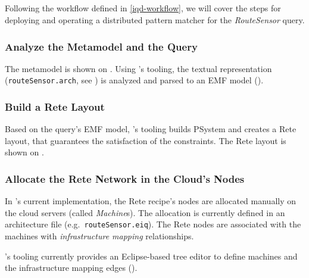 \subsection{}
\label{}

Following the workflow defined in \autoref{iqd-workflow}, we will cover the steps for deploying and operating a distributed pattern matcher for the \textit{RouteSensor} query.


\subsubsection{Analyze the Metamodel and the Query}

The metamodel is shown on . Using \eiq{}'s tooling, the textual representation (\texttt{routeSensor.arch}, see ) is analyzed and parsed to an EMF model ().


\subsubsection{Build a Rete Layout}

Based on the query's EMF model, \eiq{}'s tooling builds PSystem and creates a Rete layout, that guarantees the satisfaction of the constraints. The Rete layout is shown on . 
 

\subsubsection{Allocate the Rete Network in the Cloud's Nodes} 

In \iqd{}'s current implementation, the Rete recipe's nodes are allocated manually on the cloud servers (called \textit{Machine}s). The allocation is currently defined in an architecture file (e.g.\ \texttt{routeSensor.eiq}). The Rete nodes are associated with the machines with \textit{infrastructure mapping} relationships.

\iqd{}'s tooling currently provides an Eclipse-based tree editor to define machines and the infrastructure mapping edges ().


